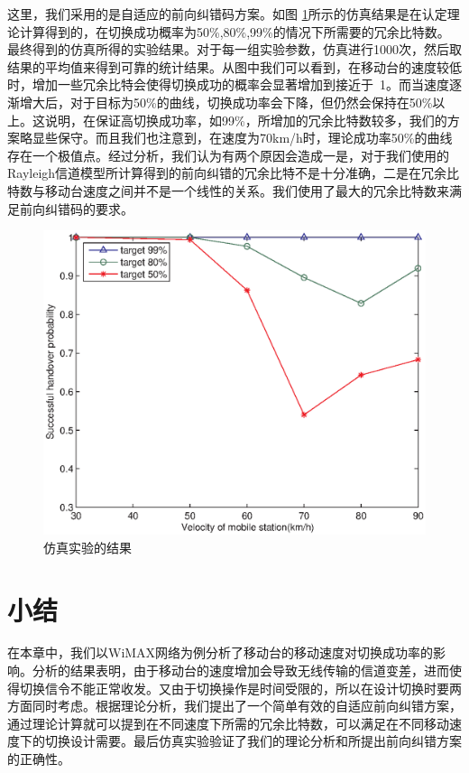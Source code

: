 这里，我们采用的是自适应的前向纠错码方案。如图 \ref{fig:chap_iccs_results}所示的仿真结果是在认定理论计算得到的，在切换成功概率为50\%,80\%,99\%的情况下所需要的冗余比特数。最终得到的仿真所得的实验结果。对于每一组实验参数，仿真进行1000次，然后取结果的平均值来得到可靠的统计结果。从图中我们可以看到，在移动台的速度较低时，增加一些冗余比特会使得切换成功的概率会显著增加到接近于~1。而当速度逐渐增大后，对于目标为50\%的曲线，切换成功率会下降，但仍然会保持在50\%以上。这说明，在保证高切换成功率，如99\%，所增加的冗余比特数较多，我们的方案略显些保守。而且我们也注意到，在速度为70km/h时，理论成功率50\%的曲线存在一个极值点。经过分析，我们认为有两个原因会造成一是，对于我们使用的Rayleigh信道模型所计算得到的前向纠错的冗余比特不是十分准确，二是在冗余比特数与移动台速度之间并不是一个线性的关系。我们使用了最大的冗余比特数来满足前向纠错码的要求。

\begin{figure}[htbp]
\begin{centering}
\includegraphics[scale=0.8]{iccs_speed_prob_simu}
\caption{仿真实验的结果}
\label{fig:chap_iccs_results}
\end{centering}
\end{figure}

\section{小结}
在本章中，我们以WiMAX网络为例分析了移动台的移动速度对切换成功率的影响。分析的结果表明，由于移动台的速度增加会导致无线传输的信道变差，进而使得切换信令不能正常收发。又由于切换操作是时间受限的，所以在设计切换时要两方面同时考虑。根据理论分析，我们提出了一个简单有效的自适应前向纠错方案，通过理论计算就可以提到在不同速度下所需的冗余比特数，可以满足在不同移动速度下的切换设计需要。最后仿真实验验证了我们的理论分析和所提出前向纠错方案的正确性。
